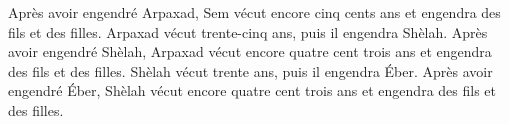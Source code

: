 Après avoir engendré Arpaxad, Sem vécut encore cinq cents ans
	et engendra des fils et des filles.
Arpaxad vécut trente-cinq ans, puis il engendra Shèlah.
Après avoir engendré Shèlah, Arpaxad vécut encore quatre cent trois ans
	et engendra des fils et des filles.
Shèlah vécut trente ans, puis il engendra Éber.
Après avoir engendré Éber, Shèlah vécut encore quatre cent trois ans
	et engendra des fils et des filles.
